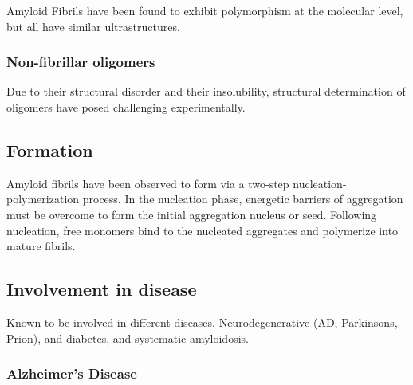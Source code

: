 
Amyloid Fibrils have been found to exhibit polymorphism at the molecular level, but all have similar ultrastructures.  %


  \subsubsection{Non-fibrillar oligomers}
   Due to their structural disorder and their insolubility, structural determination of oligomers have posed challenging experimentally.
	
 \subsection{Formation}

  Amyloid fibrils have been observed to form via a two-step nucleation-polymerization process. In the nucleation phase, energetic barriers of aggregation must be overcome to form the initial aggregation nucleus or seed.  Following nucleation, free monomers bind to the nucleated aggregates and polymerize into mature fibrils.\cite{Murphy:2002fe}

\subsection{Involvement in disease}
Known to be involved in different diseases. Neurodegenerative (AD, Parkinsons, Prion), and diabetes, and systematic amyloidosis.

\subsubsection{Alzheimer's Disease}

